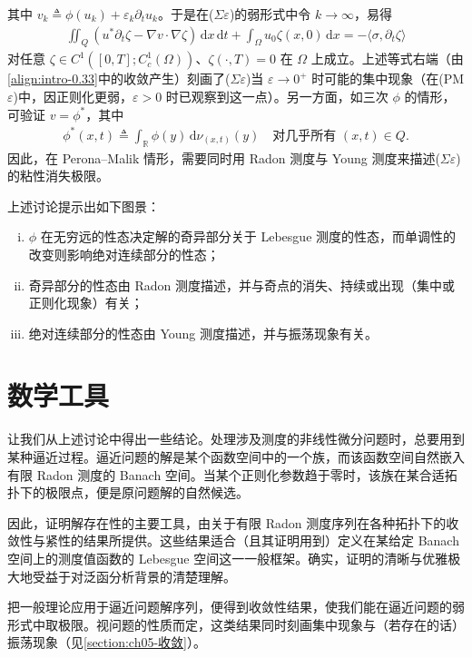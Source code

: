 \documentclass[../main.tex]{subfiles}
\begin{document}
其中 $v_k\triangleq \phi(u_k)+\varepsilon_k\partial_t u_k$。于是在($\Sigma\varepsilon$)的弱形式中令 $k\to\infty$，易得
\begin{align*}
\iint_Q(u^*\partial_t\zeta - \nabla v\cdot\nabla\zeta)\,\mathrm{d}x\,\mathrm{d}t
+ \int_\Omega u_0\zeta(x,0)\,\mathrm{d}x
= -\langle\sigma,\partial_t\zeta\rangle
\end{align*}
对任意 $\zeta\in C^1([0,T];C^1_c(\Omega))$、$\zeta(\cdot,T)=0$ 在 $\Omega$ 上成立。上述等式右端（由\eqref{align:intro-0.33}中的收敛产生）刻画了($\Sigma\varepsilon$)当 $\varepsilon\to0^+$ 时可能的集中现象（在(PM$\varepsilon$)中，因正则化更弱，$\varepsilon>0$ 时已观察到这一点）。另一方面，如三次 $\phi$ 的情形，可验证 $v=\phi^*$，其中
\begin{align*}
\phi^*(x,t)\triangleq \int_{\mathbb{R}}\phi(y)\,\mathrm{d}\nu_{(x,t)}(y)
\quad \text{对几乎所有 }(x,t)\in Q.
\end{align*}
因此，在 Perona--Malik 情形，需要同时用 Radon 测度与 Young 测度来描述($\Sigma\varepsilon$)的粘性消失极限。

上述讨论提示出如下图景：
\begin{enumerate}[(i)]
\item $\phi$ 在无穷远的性态决定解的奇异部分关于 Lebesgue 测度的性态，而单调性的改变则影响绝对连续部分的性态；
\item 奇异部分的性态由 Radon 测度描述，并与奇点的消失、持续或出现（集中或正则化现象）有关；
\item 绝对连续部分的性态由 Young 测度描述，并与振荡现象有关。
\end{enumerate}

\section*{数学工具}\label{section:intro-tools}

让我们从上述讨论中得出一些结论。处理涉及测度的非线性微分问题时，总要用到某种逼近过程。逼近问题的解是某个函数空间中的一个族，而该函数空间自然嵌入有限 Radon 测度的 Banach 空间。当某个正则化参数趋于零时，该族在某合适拓扑下的极限点，便是原问题解的自然候选。

因此，证明解存在性的主要工具，由关于有限 Radon 测度序列在各种拓扑下的收敛性与紧性的结果所提供。这些结果适合（且其证明用到）定义在某给定 Banach 空间上的测度值函数的 Lebesgue 空间这一一般框架。确实，证明的清晰与优雅极大地受益于对泛函分析背景的清楚理解。

把一般理论应用于逼近问题解序列，便得到收敛性结果，使我们能在逼近问题的弱形式中取极限。视问题的性质而定，这类结果同时刻画集中现象与（若存在的话）振荡现象（见\cref{section:ch05-收敛}）。
\end{document}
